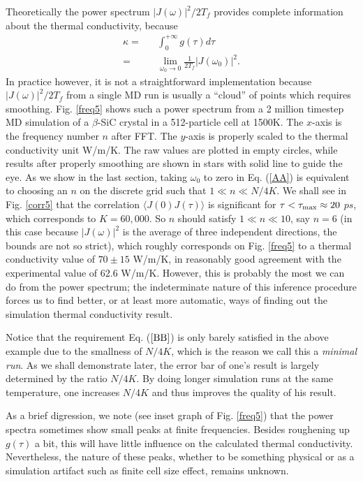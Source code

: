 Theoretically the power spectrum $|J(\omega)|^2/2T_f$ provides complete
information about the thermal conductivity, because
\begin{eqnarray} 
\kappa = && \int_0^{+\infty} g(\tau) d\tau \nonumber\\
=&& \lim_{\omega_0\rightarrow 0} \frac{1}{2T_{f}} 
\left | J(\omega_0) \right |^2.
\label{AA}
\end{eqnarray}
In practice however, it is not a straightforward implementation
because $|J(\omega)|^2/2T_{f}$ from a single MD run is usually a
``cloud'' of points which requires smoothing. Fig.  \ref{freq5} shows
such a power spectrum from a 2 million timestep MD simulation of a
$\beta$-SiC crystal in a 512-particle cell at 1500K. The $x$-axis is
the frequency number $n$ after FFT. The $y$-axis is properly scaled to
the thermal conductivity unit W/m/K. The raw values are plotted in
empty circles, while results after properly smoothing are shown in
stars with solid line to guide the eye. As we show in the last
section, taking $\omega_0$ to zero in Eq.  (\ref{AA}) is equivalent to
choosing an $n$ on the discrete grid such that $1\ll n \ll N/4K$. We
shall see in Fig.  \ref{corr5} that the correlation $\langle
J(0)J(\tau) \rangle$ is significant for $\tau < \tau_{\rm max} \approx
20$ $ps$, which corresponds to $K = 60,000$.  So $n$ should satisfy $1
\ll n \ll 10$, say $n=6$ (in this case because $|J(\omega)|^2$ is the
average of three independent directions, the bounds are not so
strict), which roughly corresponds on Fig.  \ref{freq5} to a thermal
conductivity value of $70\pm 15$ W/m/K, in reasonably good agreement
with the experimental value of $62.6$ W/m/K.  However, this is
probably the most we can do from the power spectrum; the indeterminate
nature of this inference procedure forces us to find better, or at
least more automatic, ways of finding out the simulation thermal
conductivity result.

Notice that the requirement Eq. ($\ref{BB}$) is only barely satisfied
in the above example due to the smallness of $N/4K$, which is the
reason we call this a {\em minimal run}. As we shall demonstrate
later, the error bar of one's result is largely determined by the
ratio $N/4K$. By doing longer simulation runs at the same temperature,
one increases $N/4K$ and thus improves the quality of his result.

As a brief digression, we note (see inset graph of Fig. \ref{freq5})
that the power spectra sometimes show small peaks at finite
frequencies.  Besides roughening up $g(\tau)$ a bit, this will have
little influence on the calculated thermal conductivity.
Nevertheless, the nature of these peaks, whether to be something
physical or as a simulation artifact such as finite cell size effect,
remains unknown.

